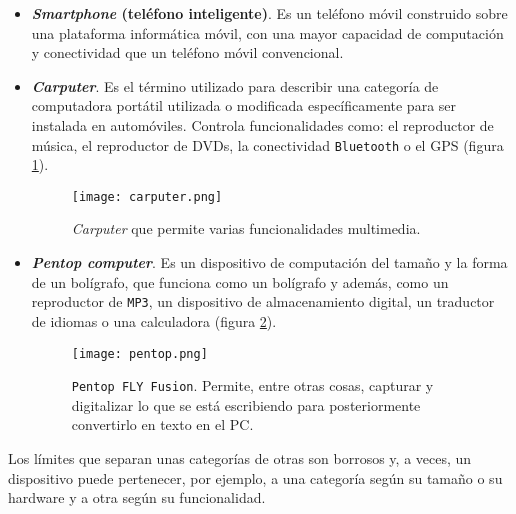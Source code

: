 \begin{itemize}
\item \textbf{\emph{Smartphone} (teléfono inteligente)}. Es un teléfono móvil 
construido sobre una plataforma informática móvil, con una mayor capacidad de 
computación y conectividad que un teléfono móvil convencional.
\item \textbf{\emph{Carputer}}. Es el término utilizado para describir una 
categoría de computadora portátil utilizada o modificada específicamente para 
ser instalada en automóviles. Controla funcionalidades como: el reproductor
de música, el reproductor de DVDs, la conectividad \texttt{Bluetooth} o
el \acs{GPS} (figura \ref{fig:carputer}).

  \begin{figure}[h]
    \begin{center}
      \texttt{[image: carputer.png]}
      \caption{\emph{Carputer} que permite varias funcionalidades multimedia.}
      \label{fig:carputer}
    \end{center}
  \end{figure}

\item \textbf{\emph{Pentop computer}}. Es un dispositivo de computación del
tamaño y la forma de un bolígrafo, que funciona como un bolígrafo y además,
como un reproductor de \texttt{MP3}, un dispositivo de almacenamiento digital,
un traductor de idiomas o una calculadora (figura \ref{fig:pentop}).

  \begin{figure}[h]
    \begin{center}
      \texttt{[image: pentop.png]}
      \caption{\texttt{Pentop FLY Fusion}. Permite, entre otras cosas, 
      capturar y digitalizar lo que se está escribiendo para posteriormente
      convertirlo en texto en el PC.}
      \label{fig:pentop}
    \end{center}
  \end{figure}

\end{itemize}
Los límites que separan unas categorías de otras son borrosos y, a veces, un
dispositivo puede pertenecer, por ejemplo, a una categoría según su tamaño o
su hardware y a otra según su funcionalidad.

